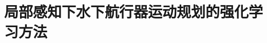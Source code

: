 \documentclass[11pt]{report}
\begin{document}
\setcounter{chapter}{4}
\chapter{局部感知下水下航行器运动规划的强化学习方法}
\label{chap:deployable_offline_rl}



\end{document}
